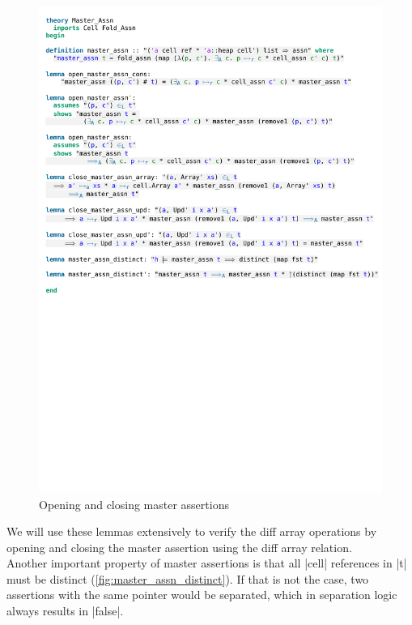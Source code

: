 \begin{figure}[htpb]
    \includegraphics[trim={0 15cm 0 5,4cm}, clip, width=1.00\textwidth]{figures/Theory_Master_Assn.pdf}
    \caption[Master assertion lemmas]{Opening and closing master assertions}
    \label{fig:master_assn_lemmas}
\end{figure}

\noindent We will use these lemmas extensively to verify the diff array operations by opening and closing the master assertion using the diff array relation. \\
Another important property of master assertions is that all |cell| references in |t| must be distinct (\autoref{fig:master_assn_distinct}). If that is not the case, two assertions with the same pointer would be separated, which in separation logic always results in |false|.

